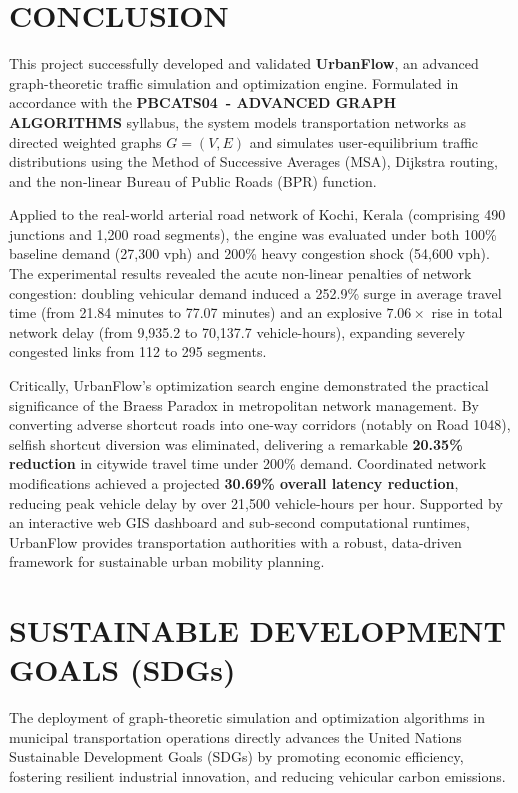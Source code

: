 \documentclass[12pt,a4paper]{report}
\newcommand{\coursecode}{PBCATS04}
\newcommand{\coursename}{ADVANCED GRAPH ALGORITHMS}
\begin{document}
\chapter{CONCLUSION}
\label{chap:conclusion}
This project successfully developed and validated \textbf{UrbanFlow}, an advanced graph-theoretic traffic simulation and optimization engine. Formulated in accordance with the \textbf{\coursecode\ - \coursename} syllabus, the system models transportation networks as directed weighted graphs $G=(V, E)$ and simulates user-equilibrium traffic distributions using the Method of Successive Averages (MSA), Dijkstra routing, and the non-linear Bureau of Public Roads (BPR) function.

Applied to the real-world arterial road network of Kochi, Kerala (comprising 490 junctions and 1,200 road segments), the engine was evaluated under both 100\% baseline demand (27,300 vph) and 200\% heavy congestion shock (54,600 vph). The experimental results revealed the acute non-linear penalties of network congestion: doubling vehicular demand induced a 252.9\% surge in average travel time (from 21.84 minutes to 77.07 minutes) and an explosive $7.06\times$ rise in total network delay (from 9,935.2 to 70,137.7 vehicle-hours), expanding severely congested links from 112 to 295 segments.

Critically, UrbanFlow's optimization search engine demonstrated the practical significance of the Braess Paradox in metropolitan network management. By converting adverse shortcut roads into one-way corridors (notably on Road 1048), selfish shortcut diversion was eliminated, delivering a remarkable \textbf{20.35\% reduction} in citywide travel time under 200\% demand. Coordinated network modifications achieved a projected \textbf{30.69\% overall latency reduction}, reducing peak vehicle delay by over 21,500 vehicle-hours per hour. Supported by an interactive web GIS dashboard and sub-second computational runtimes, UrbanFlow provides transportation authorities with a robust, data-driven framework for sustainable urban mobility planning.

\chapter{SUSTAINABLE DEVELOPMENT GOALS (SDGs)}
\label{chap:sdgs}
The deployment of graph-theoretic simulation and optimization algorithms in municipal transportation operations directly advances the United Nations Sustainable Development Goals (SDGs) by promoting economic efficiency, fostering resilient industrial innovation, and reducing vehicular carbon emissions.
\end{document}
